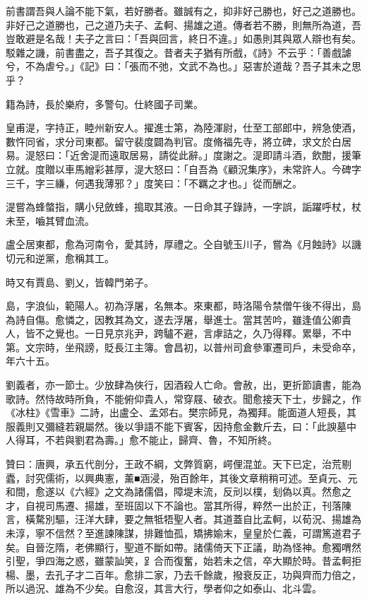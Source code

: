 \begin{pinyinscope}
 前書謂吾與人論不能下氣，若好勝者。雖誠有之，抑非好己勝也，好己之道勝也。非好己之道勝也，己之道乃夫子、孟軻、揚雄之道。傳者若不勝，則無所為道，吾豈敢避是名哉！夫子之言曰：「吾與回言，終日不違。」如愚則其與眾人辯也有矣。駁雜之譏，前書盡之，吾子其復之。昔者夫子猶有所戲，《詩》不云乎：「善戲謔兮，不為虐兮。」《記》曰：「張而不弛，文武不為也。」惡害於道哉？吾子其未之思乎？



 籍為詩，長於樂府，多警句。仕終國子司業。



 皇甫湜，字持正，睦州新安人。擢進士第，為陸渾尉，仕至工部郎中，辨急使酒，數忤同省，求分司東都。留守裴度闢為判官。度脩福先寺，將立碑，求文於白居易。湜怒曰：「近舍湜而遠取居易，請從此辭。」度謝之。湜即請斗酒，飲酣，援筆立就。度贈以車馬繒彩甚厚，湜大怒曰：「自吾為《顧況集序》，未常許人。今碑字三千，字三縑，何遇我薄邪？」度笑曰：「不羈之才也。」從而酬之。



 湜嘗為蜂螫指，購小兒斂蜂，搗取其液。一日命其子錄詩，一字誤，詬躍呼杖，杖未至，嚙其臂血流。



 盧仝居東都，愈為河南令，愛其詩，厚禮之。仝自號玉川子，嘗為《月蝕詩》以譏切元和逆黨，愈稱其工。



 時又有賈島、劉乂，皆韓門弟子。



 島，字浪仙，範陽人。初為浮屠，名無本。來東都，時洛陽令禁僧午後不得出，島為詩自傷。愈憐之，因教其為文，遂去浮屠，舉進士。當其苦吟，雖逢值公卿貴人，皆不之覺也。一日見京兆尹，跨驢不避，言虖詰之，久乃得釋。累舉，不中第。文宗時，坐飛謗，貶長江主簿。會昌初，以普州司倉參軍遷司戶，未受命卒，年六十五。



 劉義者，亦一節士。少放肆為俠行，因酒殺人亡命。會赦，出，更折節讀書，能為歌詩。然恃故時所負，不能俯仰貴人，常穿屐、破衣。聞愈接天下士，步歸之，作《冰柱》《雪車》二詩，出盧仝、孟郊右。樊宗師見，為獨拜。能面道人短長，其服義則又彌縫若親屬然。後以爭語不能下賓客，因持愈金數斤去，曰：「此諛墓中人得耳，不若與劉君為壽。」愈不能止，歸齊、魯，不知所終。



 贊曰：唐興，承五代剖分，王政不綱，文弊質窮，崿俚混並。天下已定，治荒剔蠹，討究儒術，以興典憲，薰■涵浸，殆百餘年，其後文章稍稍可述。至貞元、元和間，愈遂以《六經》之文為諸儒倡，障堤末流，反刓以樸，刬偽以真。然愈之才，自視司馬遷、揚雄，至班固以下不論也。當其所得，粹然一出於正，刊落陳言，橫騖別驅，汪洋大肆，要之無牴牾聖人者。其道蓋自比孟軻，以荀況、揚雄為未淳，寧不信然？至進諫陳謀，排難恤孤，矯拂媮末，皇皇於仁義，可謂篤道君子矣。自晉汔隋，老佛顯行，聖道不斷如帶。諸儒倚天下正議，助為怪神。愈獨喟然引聖，爭四海之惑，雖蒙訕笑，𧾷合而復奮，始若未之信，卒大顯於時。昔孟軻拒楊、墨，去孔子才二百年。愈排二家，乃去千餘歲，撥衰反正，功與齊而力倍之，所以過況、雄為不少矣。自愈沒，其言大行，學者仰之如泰山、北斗雲。



\end{pinyinscope}